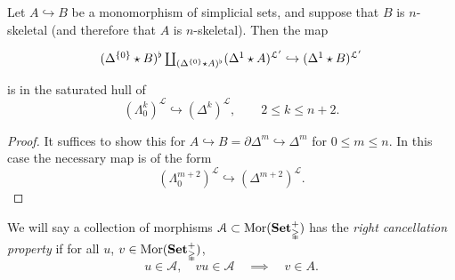 \documentclass[main.tex]{subfiles}
\begin{document}
\begin{lemma}
  \label{lemma:starred_smash_with_mono}
  Let $A \hookrightarrow B$ be a monomorphism of simplicial sets, and suppose that $B$ is $n$-skeletal (and therefore that $A$ is $n$-skeletal). Then the map
  \begin{equation*}
    \begin{tikzcd}
      (\Delta^{\{0\}} \star B)^{\flat} \coprod_{(\Delta^{\{0\}} \star A)^{\flat}} (\Delta^{1} \star A)^{\mathcal{L}'} \hookrightarrow (\Delta^{1} \star B)^{\mathcal{L}'}
    \end{tikzcd}
  \end{equation*}
  is in the saturated hull of
  \begin{equation*}
    (\Lambda^{k}_{0})^{\mathcal{L}} \hookrightarrow (\Delta^{k})^{\mathcal{L}},\qquad 2 \leq k \leq n+2.
  \end{equation*}
\end{lemma}
\begin{proof}
  It suffices to show this for $A \hookrightarrow B = \partial \Delta^{m} \hookrightarrow \Delta^{m}$ for $0 \leq m \leq n$. In this case the necessary map is of the form
  \begin{equation*}
    (\Lambda^{m+2}_{0})^{\mathcal{L}} \hookrightarrow (\Delta^{m+2})^{\mathcal{L}}.
  \end{equation*}
\end{proof}

We will say a collection of morphisms $\mathcal{A} \subset \mathrm{Mor}(\mathbf{Set}_{\mathbb{\Delta}}^{+})$ has the \emph{right cancellation property} if for all $u$, $v \in \mathrm{Mor}(\mathbf{Set}_{\mathbb{\Delta}}^{+})$,
\begin{equation*}
  u \in \mathcal{A},\quad vu \in \mathcal{A} \quad \implies \quad v \in A.
\end{equation*}
\end{document}
